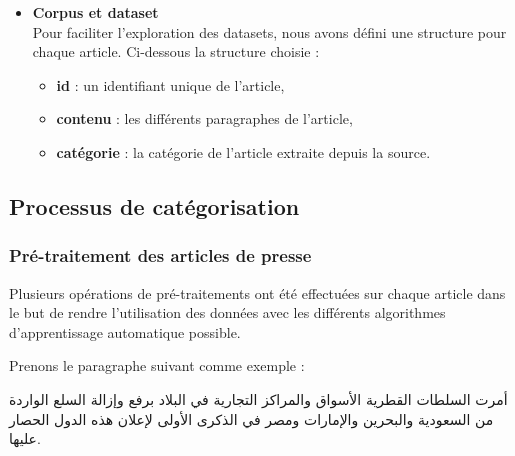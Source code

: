     \begin{itemize}[leftmargin=*, label={}]
        \item{\textbf{Corpus et dataset}}\\
            Pour faciliter l'exploration des datasets, nous avons défini une structure pour chaque article. Ci-dessous la structure choisie :
            \begin{itemize}
               \item{\textbf{id} : }un identifiant unique de l'article,
               \item{\textbf{contenu} : }les différents paragraphes de l'article,
               \item{\textbf{catégorie} : }la catégorie de l'article extraite depuis la source.
            \end{itemize}
    \end{itemize}

    \subsection{Processus de catégorisation}
        \subsubsection{Pré-traitement des articles de presse}\label{pretraitement}
        Plusieurs opérations de pré-traitements ont été effectuées sur chaque article dans le but de rendre l'utilisation des données avec les différents algorithmes d'apprentissage automatique possible.

        Prenons le paragraphe suivant comme exemple :

            \begin{arab}أمرت السلطات القطرية الأسواق والمراكز التجارية في البلاد برفع وإزالة السلع الواردة من السعودية والبحرين والإمارات ومصر في الذكرى الأولى لإعلان هذه الدول الحصار عليها.\end{arab}
            
